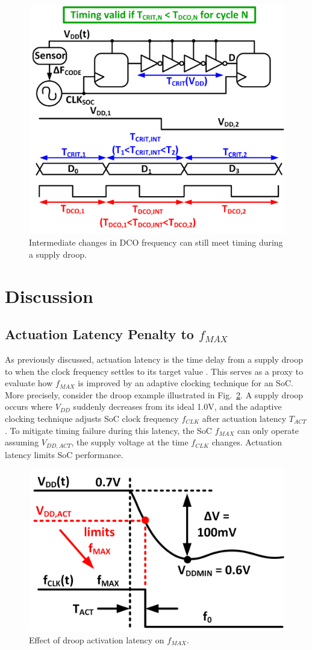 \documentclass[twoside,9pt,journal,letterpage]{IEEEtran}
\begin{document}
\vspace{-10pt}
\begin{figure}[h]
	\centering
	\includegraphics[width=0.7\columnwidth]{fig_subtledelay.png}
	\caption{Intermediate changes in DCO frequency can still meet timing during a supply droop.}
	\label{fig:subtledelay}
\end{figure}

\section{Discussion}
\label{sec:discussion}
\subsection{Actuation Latency Penalty to $f_{MAX}$}
\label{sec:actuation_latency}

As previously discussed, actuation latency is the time delay from a supply droop to when the clock frequency settles to its target value \cite{wilcox2015}. This serves as a proxy to evaluate how $f_{MAX}$ is improved by an adaptive clocking technique for an SoC. More precisely, consider the droop example illustrated in Fig.\ \ref{fig:drooplatency}. A supply droop occurs where $V_{DD}$ suddenly decreases from its ideal 1.0V, and the adaptive clocking technique adjusts SoC clock frequency $f_{CLK}$ after actuation latency $T_{ACT}$. To mitigate timing failure during this latency, the SoC $f_{MAX}$ can only operate assuming $V_{DD,ACT}$, the supply voltage at the time $f_{CLK}$ changes. Actuation latency limits SoC performance.

\begin{figure}[!ht]
	\centering
	\includegraphics[width=0.6\columnwidth]{fig_drooplatency}
	\caption{Effect of droop activation latency on $f_{MAX}$.}
	\label{fig:drooplatency}
\end{figure}
\end{document}
